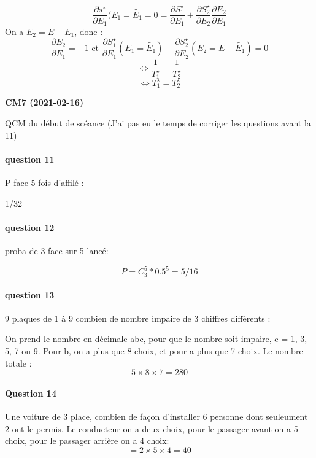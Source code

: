 \documentclass[12pt,a4paper]{report}
\begin{document}
\[
	\dfrac{\partial s^\star}{\partial E_1}(E_1 = \tilde{E_1} = 0 = \dfrac{\partial S_1^\star}{\partial E_1} + \dfrac{\partial S_2^\star}{\partial E_2} \dfrac{\partial E_2}{\partial E_1}
\]
On a \(E_2 = E-E_1\), donc :
\[
	\dfrac{\partial E_2}{\partial E_1} = -1 \text{ et } \dfrac{\partial S_1^\star}{\partial E_1} (E_1 = \tilde{E_1}) - \dfrac{\partial S_2^\star}{\partial E_2} (E_2 = E - \tilde{E_1}) = 0
\]
\[
	\Leftrightarrow \dfrac{1}{T_1^\star} = \dfrac{1}{T_2^\star}
\]
\[
	\Leftrightarrow T_1^\star = T_2^\star
\]

\begin{center}
\textbf{CM7 (2021-02-16)}
\end{center}

QCM du début de scéance (J'ai pas eu le temps de corriger les questions avant la 11)

\paragraph{question 11}

P face 5 fois d'affilé :

1/32

\paragraph{question 12}

proba de 3 face sur 5 lancé:

\[
	P = C^5_3 * 0.5^5 = 5/16
\]

\paragraph{question 13}

9 plaques de 1 à 9 combien de nombre impaire de 3 chiffres différents :

On prend le nombre en décimale abc, pour que le nombre soit impaire, c = 1, 3, 5, 7 ou 9. Pour b, on a plus que 8 choix, et pour a plus que 7 choix. Le nombre totale :
\[
	5 \times 8 \times 7 = 280
\]

\paragraph{Question 14}

Une voiture de 3 place, combien de façon d'installer 6 personne dont seuleument 2 ont le permis. Le conducteur on a deux choix, pour le passager avant on a 5 choix, pour le passager arrière on a 4 choix:
\[
	= 2 \times 5 \times 4 = 40
\]
\end{document}
